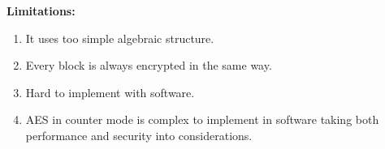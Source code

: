 \documentclass[11pt]{article}
\begin{document}
\begin{enumerate}
	      \textbf{Limitations: }\\
	      \begin{enumerate}
		      \item It uses too simple algebraic structure.
		      \item Every block is always encrypted in the same way.
		      \item Hard to implement with software.
		      \item AES in counter mode is complex to implement in software taking both performance and security into considerations.
	      \end{enumerate}

\end{enumerate}
\end{document}
